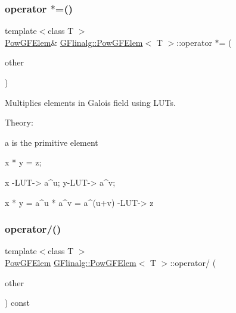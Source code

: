 \subsubsection{\texorpdfstring{operator $\ast$=()}{operator *=()}}
{\footnotesize\ttfamily template$<$class T $>$ \\
\mbox{\hyperlink{class_g_flinalg_1_1_pow_g_f_elem}{Pow\+G\+F\+Elem}}\& \mbox{\hyperlink{class_g_flinalg_1_1_pow_g_f_elem}{G\+Flinalg\+::\+Pow\+G\+F\+Elem}}$<$ T $>$\+::operator $\ast$= (\begin{DoxyParamCaption}\item[{const \mbox{\hyperlink{class_g_flinalg_1_1_pow_g_f_elem}{Pow\+G\+F\+Elem}}$<$ T $>$ \&}]{other }\end{DoxyParamCaption})\hspace{0.3cm}{\ttfamily [inline]}}



Multiplies elements in Galois field using L\+U\+Ts. 

Theory\+: \begin{DoxyVerb}a is the primitive element

x * y = z;

x -LUT-> a^u; y-LUT-> a^v;

x * y = a^u * a^v = a^(u+v) -LUT-> z
\end{DoxyVerb}
 \mbox{\label{class_g_flinalg_1_1_pow_g_f_elem_adfd3e4e39bf157091a3563bfb401a674}} 
\subsubsection{\texorpdfstring{operator/()}{operator/()}}
{\footnotesize\ttfamily template$<$class T $>$ \\
\mbox{\hyperlink{class_g_flinalg_1_1_pow_g_f_elem}{Pow\+G\+F\+Elem}} \mbox{\hyperlink{class_g_flinalg_1_1_pow_g_f_elem}{G\+Flinalg\+::\+Pow\+G\+F\+Elem}}$<$ T $>$\+::operator/ (\begin{DoxyParamCaption}\item[{const \mbox{\hyperlink{class_g_flinalg_1_1_pow_g_f_elem}{Pow\+G\+F\+Elem}}$<$ T $>$ \&}]{other }\end{DoxyParamCaption}) const\hspace{0.3cm}{\ttfamily [inline]}}



